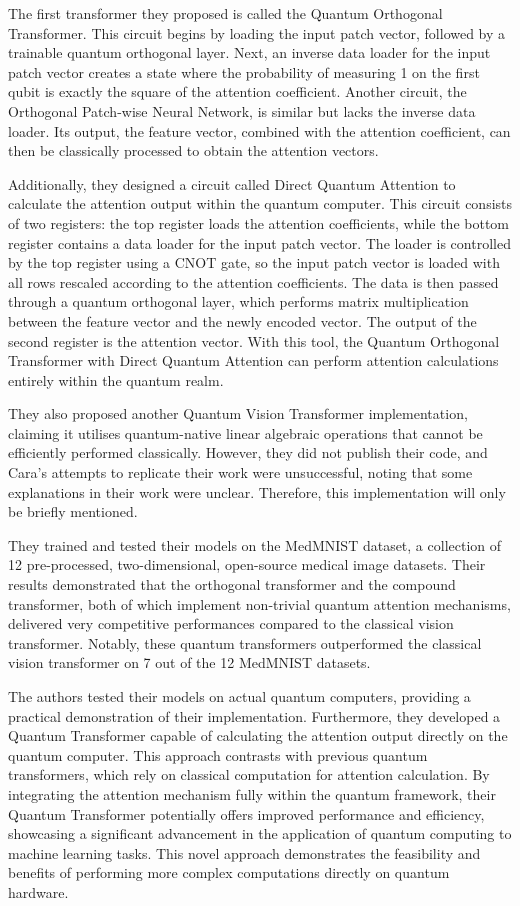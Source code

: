 The first transformer they proposed is called the Quantum Orthogonal
Transformer. This circuit begins by loading the input patch vector,
followed by a trainable quantum orthogonal layer. Next, an inverse
data loader for the input patch vector creates a state where the
probability of measuring 1 on the first qubit is exactly the square
of the attention coefficient. Another circuit, the Orthogonal
Patch-wise Neural Network, is similar but lacks the inverse data
loader. Its output, the feature vector, combined with the attention
coefficient, can then be classically processed to obtain the attention vectors.

Additionally, they designed a circuit called Direct Quantum Attention
to calculate the attention output within the quantum computer. This
circuit consists of two registers: the top register loads the
attention coefficients, while the bottom register contains a data
loader for the input patch vector. The loader is controlled by the
top register using a CNOT gate, so the input patch vector is loaded
with all rows rescaled according to the attention coefficients. The
data is then passed through a quantum orthogonal layer, which
performs matrix multiplication between the feature vector and the
newly encoded vector. The output of the second register is the
attention vector. With this tool, the Quantum Orthogonal Transformer
with Direct Quantum Attention can perform attention calculations
entirely within the quantum realm.

They also proposed another Quantum Vision Transformer implementation,
claiming it utilises quantum-native linear algebraic operations that
cannot be efficiently performed classically. However, they did not
publish their code, and Cara's attempts to replicate their work were
unsuccessful, noting that some explanations in their work were
unclear. Therefore, this implementation will only be briefly mentioned.

They trained and tested their models on the MedMNIST dataset, a
collection of 12 pre-processed, two-dimensional, open-source medical
image datasets. Their results demonstrated that the orthogonal
transformer and the compound transformer, both of which implement
non-trivial quantum attention mechanisms, delivered very competitive
performances compared to the classical vision transformer. Notably,
these quantum transformers outperformed the classical vision
transformer on 7 out of the 12 MedMNIST datasets.

The authors tested their models on actual quantum computers,
providing a practical demonstration of their implementation.
Furthermore, they developed a Quantum Transformer capable of
calculating the attention output directly on the quantum computer.
This approach contrasts with previous quantum transformers, which
rely on classical computation for attention calculation. By
integrating the attention mechanism fully within the quantum
framework, their Quantum Transformer potentially offers improved
performance and efficiency, showcasing a significant advancement in
the application of quantum computing to machine learning tasks. This
novel approach demonstrates the feasibility and benefits of
performing more complex computations directly on quantum hardware.

